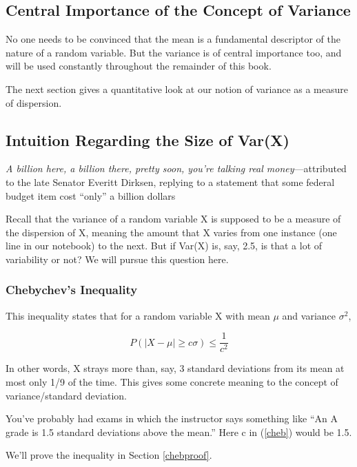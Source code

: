 \subsection{Central Importance of the Concept of Variance}

No one needs to be convinced that the mean is a fundamental descriptor
of the nature of a random variable.  But the variance is of central
importance too, and will be used constantly throughout the remainder of
this book.

The next section gives a quantitative look at our notion of variance as
a measure of dispersion.  

\subsection{Intuition Regarding the Size of Var(X)}

{\it A billion here, a billion there, pretty soon, you're talking real
money}---attributed to the late Senator Everitt Dirksen, replying to a
statement that some federal budget item cost ``only'' a billion dollars

\bigskip

Recall that the variance of a random variable X is supposed to be a
measure of the dispersion of X, meaning the amount that X varies from
one instance (one line in our notebook) to the next.  But if Var(X) is,
say, 2.5, is that a lot of variability or not?  We will pursue this
question here.

\subsubsection{Chebychev's Inequality}
\label{chebsection}

This inequality states that for a random variable X with mean $\mu$ and
variance $\sigma^2$, 

\begin{equation}
\label{cheb}
P(|X - \mu| \geq c \sigma) \leq \frac{1}{c^2}
\end{equation}

In other words, X strays more than, say, 3 standard deviations from its
mean at most only 1/9 of the time.  This gives some concrete meaning to
the concept of variance/standard deviation.

You've probably had exams in which the instructor says something like
``An A grade is 1.5 standard deviations above the mean.''  Here c in
(\ref{cheb}) would be 1.5.

We'll prove the inequality in Section \ref{chebproof}.

